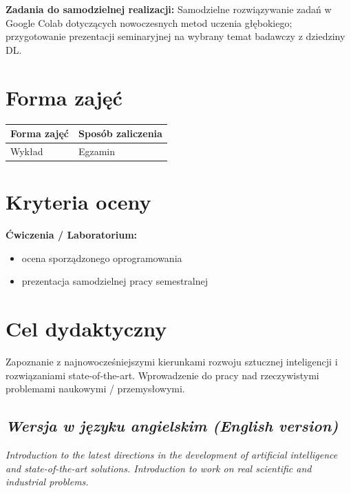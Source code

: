 \documentclass[12pt, a4paper]{article}
\newcommand{\thdrule}{\noalign{\global\setlength{\extrarowheight}{0pt}}}
\newcommand{\thdend}{\noalign{\global\setlength{\extrarowheight}{3pt}}}
\begin{document}
\vspace{4pt}
\noindent\textbf{Zadania do samodzielnej realizacji:} Samodzielne rozwiązywanie zadań w Google Colab dotyczących nowoczesnych metod uczenia głębokiego; przygotowanie prezentacji seminaryjnej na wybrany temat badawczy z dziedziny DL.

\section{Forma zajęć}

\begin{center}
{\scriptsize
\begin{tabular}{m{5cm}m{8cm}}
\thdrule\toprule
\rowcolor{pjatkRed} {\color{white}\textbf{Forma zajęć}} & {\color{white}\textbf{Sposób zaliczenia}} \\
\midrule\thdend
  \rowcolor{tableRowLight} Wykład & Egzamin \\
\bottomrule
\end{tabular}}
\end{center}

\section{Kryteria oceny}

\textbf{Ćwiczenia / Laboratorium:}
\begin{itemize}
  \item ocena sporządzonego oprogramowania
  \item prezentacja samodzielnej pracy semestralnej
\end{itemize}


\section{Cel dydaktyczny}

Zapoznanie z najnowocześniejszymi kierunkami rozwoju sztucznej inteligencji i rozwiązaniami state-of-the-art. Wprowadzenie do pracy nad rzeczywistymi problemami naukowymi / przemysłowymi.

\subsection*{\textit{Wersja w języku angielskim (English version)}}

\textit{Introduction to the latest directions in the development of artificial intelligence and state-of-the-art solutions. Introduction to work on real scientific and industrial problems.}
\end{document}
